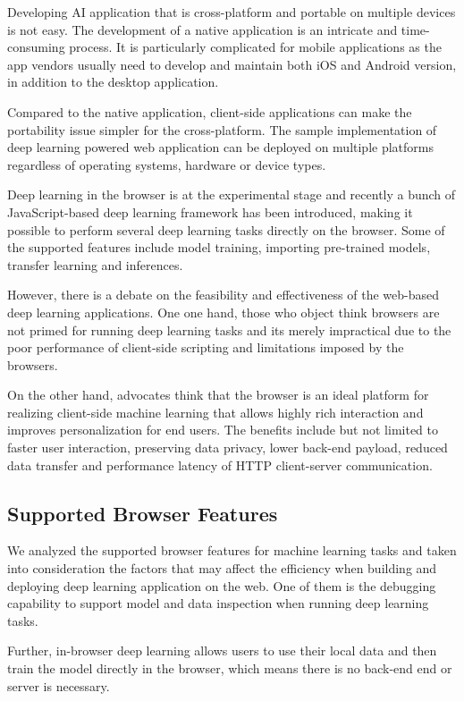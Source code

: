 Developing AI application that is cross-platform and portable on multiple devices is not easy. The development of a native application is an intricate and time-consuming process. It is particularly complicated for mobile applications as the app vendors usually need to develop and maintain both iOS and Android version, in addition to the desktop application.

Compared to the native application, client-side applications can make the portability issue simpler for the cross-platform. The sample implementation of deep learning powered web application can be deployed on multiple platforms regardless of operating systems, hardware or device types.

Deep learning in the browser is at the experimental stage and recently a bunch of JavaScript-based deep learning framework has been introduced, making it possible to perform several deep learning tasks directly on the browser. Some of the supported features include model training, importing pre-trained models, transfer learning and inferences.

However, there is a debate on the feasibility and effectiveness of the web-based deep learning applications. One one hand, those who object think browsers are not primed for running deep learning tasks and its merely impractical due to the poor performance of client-side scripting and limitations imposed by the browsers. 

On the other hand, advocates think that the browser is an ideal platform for realizing client-side machine learning that allows highly rich interaction and improves personalization for end users. The benefits include but not limited to faster user interaction, preserving data privacy, lower back-end payload, reduced data transfer and performance latency of HTTP client-server communication.

\subsection{Supported Browser Features}
We analyzed the supported browser features for machine learning tasks and taken into consideration the factors that may affect the efficiency when building and deploying deep learning application on the web. One of them is the debugging capability to support model and data inspection when running deep learning tasks.

Further, in-browser deep learning allows users to use their local data and then train the model directly in the browser, which means there is no back-end end or server is necessary. 

